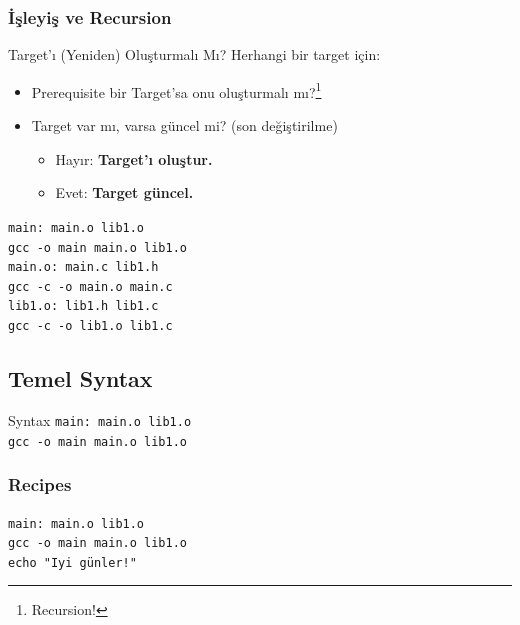 \documentclass{beamer}
\begin{document}
\subsubsection{İşleyiş ve Recursion}
\begin{frame}
    {Target'ı (Yeniden) Oluşturmalı Mı?}
    Herhangi bir target için:
    \begin{itemize}
        \item Prerequisite bir Target'sa onu oluşturmalı mı?\footnote{Recursion!}
        \item Target var mı, varsa güncel mi? (son değiştirilme)
            \begin{itemize}
                \item Hayır: \textbf{Target'ı oluştur.}
                \item Evet: \textbf{Target güncel.}

            \end{itemize}
    \end{itemize}
        
\end{frame}

\begin{frame}

    \texttt{main: main.o lib1.o \\
    \hspace{10mm}	gcc -o main main.o lib1.o \\\vspace{3mm}
main.o: main.c lib1.h\\
	\hspace{10mm}	gcc -c -o main.o main.c\\\vspace{3mm}
lib1.o: lib1.h lib1.c\\
    \hspace{10mm}	gcc -c -o lib1.o lib1.c\\}
    
\end{frame}

\subsection{Temel Syntax}
\begin{frame}
    {Syntax}
    \texttt{main: main.o lib1.o \\
    \hspace{10mm}	gcc -o main main.o lib1.o}
\end{frame}
\subsubsection{Recipes}
\begin{frame}
    \texttt{main: main.o lib1.o \\
    \hspace{10mm}	gcc -o main main.o lib1.o\\
    \hspace{10mm}   echo "Iyi günler!"}
\end{frame}
\end{document}
